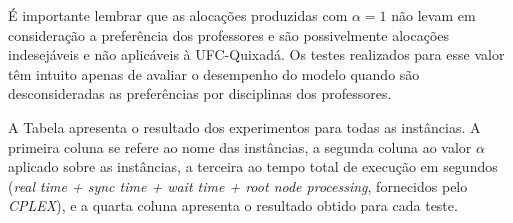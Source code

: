 É importante lembrar que as alocações produzidas com $\alpha = 1$ não levam em consideração a preferência dos professores e são possivelmente alocações indesejáveis e não aplicáveis à UFC-Quixadá. Os testes realizados para esse valor têm intuito apenas de avaliar o desempenho do modelo quando são desconsideradas as preferências por disciplinas dos professores.

A Tabela  apresenta o resultado dos experimentos para todas as instâncias. A primeira coluna se refere ao nome das instâncias, a segunda coluna ao valor $\alpha$ aplicado sobre as instâncias, a terceira ao tempo total de execução em segundos (\textit{real time + sync time + wait time + root node processing}, fornecidos pelo \textit{CPLEX}), e a quarta coluna apresenta o resultado obtido para cada teste.

